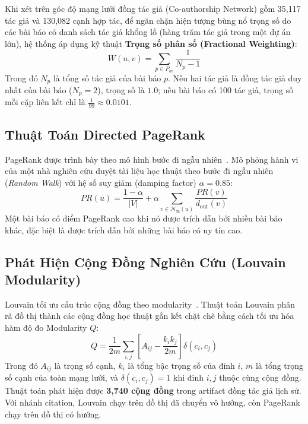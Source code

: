 Khi xét trên góc độ mạng lưới đồng tác giả (Co-authorship Network) gồm 35,117 tác giả và 130,082 cạnh hợp tác, để ngăn chặn hiện tượng bùng nổ trọng số do các bài báo có danh sách tác giả khổng lồ (hàng trăm tác giả trong một dự án lớn), hệ thống áp dụng kỹ thuật \textbf{Trọng số phân số (Fractional Weighting)}:
\begin{equation}
  W(u, v) = \sum_{p \in P_{uv}} \frac{1}{N_p - 1}
\end{equation}
Trong đó $N_p$ là tổng số tác giả của bài báo $p$. Nếu hai tác giả là đồng tác giả duy nhất của bài báo ($N_p = 2$), trọng số là $1.0$; nếu bài báo có 100 tác giả, trọng số mỗi cặp liên kết chỉ là $\frac{1}{99} \approx 0.0101$.

\subsection{Thuật Toán Directed PageRank}
PageRank được trình bày theo mô hình bước đi ngẫu nhiên~\cite{page1999pagerank}.
Mô phỏng hành vi của một nhà nghiên cứu duyệt tài liệu học thuật theo bước đi ngẫu nhiên (\textit{Random Walk}) với hệ số suy giảm (damping factor) $\alpha = 0.85$:
\begin{equation}
  PR(u) = \frac{1 - \alpha}{|V|} + \alpha \sum_{v \in \mathcal{N}_{\text{in}}(u)} \frac{PR(v)}{d_{\text{out}}(v)}
\end{equation}
Một bài báo có điểm PageRank cao khi nó được trích dẫn bởi nhiều bài báo khác, đặc biệt là được trích dẫn bởi những bài báo có uy tín cao.

\subsection{Phát Hiện Cộng Đồng Nghiên Cứu (Louvain Modularity)}
Louvain tối ưu cấu trúc cộng đồng theo modularity~\cite{blondel2008fast}.
Thuật toán Louvain phân rã đồ thị thành các cộng đồng học thuật gắn kết chặt chẽ bằng cách tối ưu hóa hàm độ đo Modularity $Q$:
\begin{equation}
  Q = \frac{1}{2m} \sum_{i, j} \left[ A_{ij} - \frac{k_i k_j}{2m} \right] \delta(c_i, c_j)
\end{equation}
Trong đó $A_{ij}$ là trọng số cạnh, $k_i$ là tổng bậc trọng số của đỉnh $i$, $m$ là tổng trọng số cạnh của toàn mạng lưới, và $\delta(c_i, c_j) = 1$ khi đỉnh $i, j$ thuộc cùng cộng đồng. Thuật toán phát hiện được \textbf{3,740 cộng đồng} trong artifact đồng tác giả lịch sử. Với nhánh citation, Louvain chạy trên đồ thị đã chuyển vô hướng, còn PageRank chạy trên đồ thị có hướng.

